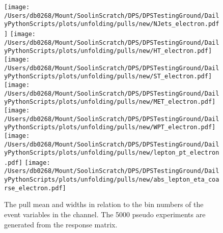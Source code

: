 \begin{figure*}[hp]
	\centering
	\texttt{[image: /Users/db0268/Mount/SoolinScratch/DPS/DPSTestingGround/DailyPythonScripts/plots/unfolding/pulls/new/NJets\_electron.pdf]} 
	\texttt{[image: /Users/db0268/Mount/SoolinScratch/DPS/DPSTestingGround/DailyPythonScripts/plots/unfolding/pulls/new/HT\_electron.pdf]} 
	\texttt{[image: /Users/db0268/Mount/SoolinScratch/DPS/DPSTestingGround/DailyPythonScripts/plots/unfolding/pulls/new/ST\_electron.pdf]} \\
	\texttt{[image: /Users/db0268/Mount/SoolinScratch/DPS/DPSTestingGround/DailyPythonScripts/plots/unfolding/pulls/new/MET\_electron.pdf]} 
	\texttt{[image: /Users/db0268/Mount/SoolinScratch/DPS/DPSTestingGround/DailyPythonScripts/plots/unfolding/pulls/new/WPT\_electron.pdf]} \\
	\texttt{[image: /Users/db0268/Mount/SoolinScratch/DPS/DPSTestingGround/DailyPythonScripts/plots/unfolding/pulls/new/lepton\_pt\_electron.pdf]} 
	\texttt{[image: /Users/db0268/Mount/SoolinScratch/DPS/DPSTestingGround/DailyPythonScripts/plots/unfolding/pulls/new/abs\_lepton\_eta\_coarse\_electron.pdf]} 
	\caption[The pull mean and widths in relation to the bin numbers of the event variables in the \eJets{} channel. The 5000 pseudo experiments are generated from the \powhegpythia{} response matrix.]{The pull mean and widths in relation to the bin numbers of the event variables in the \eJets{} channel. The 5000 pseudo experiments are generated from the \powhegpythia{} response matrix.}
	\label{fig:Pullse}
\end{figure*}

